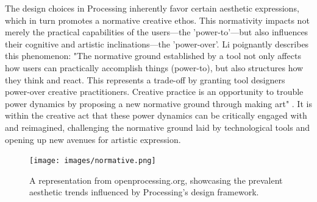 The design choices in Processing inherently favor certain aesthetic expressions, which in turn promotes a normative creative ethos. This normativity impacts not merely the practical capabilities of the users—the 'power-to'—but also influences their cognitive and artistic inclinations—the 'power-over'. Li poignantly describes this phenomenon: "The normative ground established by a tool not only affects how users can practically accomplish things (power-to), but also structures how they think and react. This represents a trade-off by granting tool designers power-over creative practitioners. Creative practice is an opportunity to trouble power dynamics by proposing a new normative ground through making art" \parencite[65]{liRethinkingPowerDynamics2023}. It is within the creative act that these power dynamics can be critically engaged with and reimagined, challenging the normative ground laid by technological tools and opening up new avenues for artistic expression.

\begin{figure}
    \centering
    \texttt{[image: images/normative.png]}
    \caption{A representation from openprocessing.org, showcasing the prevalent aesthetic trends influenced by Processing's design framework.}
    \label{fig:normative}
\end{figure}
